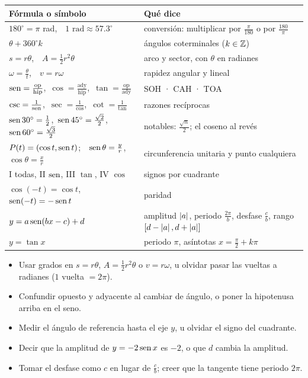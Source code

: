 \documentclass[11pt,a4paper]{article}
\begin{document}
\repaso
\begin{center}
\begin{tabularx}{\linewidth}{@{}l L@{}}
\toprule
Fórmula o símbolo & Qué dice\\ \midrule
$180^\circ=\pi$ rad,\ \ $1\text{ rad}\approx57.3^\circ$ & conversión: multiplicar por $\frac{\pi}{180}$ o por $\frac{180}{\pi}$\\
$\theta+360^\circ k$ & ángulos coterminales ($k\in\mathbb{Z}$)\\
$s=r\theta$,\ \ $A=\frac12r^2\theta$ & arco y sector, con $\theta$ en radianes\\
$\omega=\frac{\theta}{t}$,\ \ $v=r\omega$ & rapidez angular y lineal\\
$\operatorname{sen}=\frac{\text{op}}{\text{hip}}$,\ $\cos=\frac{\text{ady}}{\text{hip}}$,\ $\tan=\frac{\text{op}}{\text{ady}}$ & SOH · CAH · TOA\\
$\csc=\frac{1}{\operatorname{sen}}$,\ $\sec=\frac{1}{\cos}$,\ $\cot=\frac{1}{\tan}$ & razones recíprocas\\
$\operatorname{sen}30^\circ=\frac12$,\ $\operatorname{sen}45^\circ=\frac{\sqrt2}{2}$,\ $\operatorname{sen}60^\circ=\frac{\sqrt3}{2}$ & notables: $\frac{\sqrt n}{2}$; el coseno al revés\\
$P(t)=(\cos t,\operatorname{sen} t)$;\ \ $\operatorname{sen}\theta=\frac yr$, $\cos\theta=\frac xr$ & circunferencia unitaria y punto cualquiera\\
I todas, II $\operatorname{sen}$, III $\tan$, IV $\cos$ & signos por cuadrante\\
$\cos(-t)=\cos t$,\ \ $\operatorname{sen}(-t)=-\operatorname{sen} t$ & paridad\\
$y=a\operatorname{sen}(bx-c)+d$ & amplitud $\left\lvert a\right\rvert$, periodo $\frac{2\pi}{b}$, desfase $\frac cb$, rango $[d-\left\lvert a\right\rvert,d+\left\lvert a\right\rvert]$\\
$y=\tan x$ & periodo $\pi$, asíntotas $x=\frac{\pi}{2}+k\pi$\\
\bottomrule
\end{tabularx}
\end{center}

\begin{ojo}
\begin{itemize}
\item Usar grados en $s=r\theta$, $A=\tfrac12r^2\theta$ o $v=r\omega$, u olvidar pasar las vueltas a radianes ($1$ vuelta $=2\pi$).
\item Confundir opuesto y adyacente al cambiar de ángulo, o poner la hipotenusa arriba en el seno.
\item Medir el ángulo de referencia hasta el eje $y$, u olvidar el signo del cuadrante.
\item Decir que la amplitud de $y=-2\operatorname{sen} x$ es $-2$, o que $d$ cambia la amplitud.
\item Tomar el desfase como $c$ en lugar de $\tfrac cb$; creer que la tangente tiene periodo $2\pi$.
\end{itemize}
\end{ojo}
\end{document}
